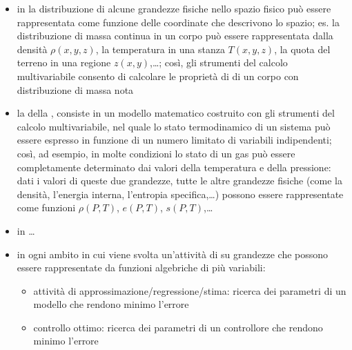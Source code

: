 \documentclass[letterpaper,10pt,italian]{jupyterBook}
\begin{document}
\begin{itemize}
\item {} 
\sphinxAtStartPar
in  la distribuzione di alcune grandezze fisiche nello spazio fisico può essere rappresentata come funzione delle coordinate che descrivono lo spazio; es. la distribuzione di massa continua in un corpo può essere rappresentata dalla densità \(\rho(x,y,z)\), la temperatura in una stanza \(T(x,y,z)\), la quota del terreno in una regione \(z(x,y)\),…; così, gli strumenti del calcolo multivariabile consento di calcolare le proprietà di  di un corpo con distribuzione di massa nota

\item {} 
\sphinxAtStartPar
la  della , consiste in un modello matematico costruito con gli strumenti del calcolo multivariabile, nel quale lo stato termodinamico di un sistema può essere espresso in funzione di un numero limitato di variabili indipendenti; così, ad esempio, in molte condizioni lo stato di un gas può essere completamente determinato dai valori della temperatura e della pressione: dati i valori di queste due grandezze, tutte le altre grandezze fisiche (come la densità, l’energia interna, l’entropia specifica,…) possono essere rappresentate come funzioni \(\rho(P,T)\), \(e(P,T)\), \(s(P,T)\),…

\item {} 
\sphinxAtStartPar
in   …

\item {} 
\sphinxAtStartPar
in ogni ambito in cui viene svolta un’attività di  su grandezze che possono essere rappresentate da funzioni algebriche di più variabili:
\begin{itemize}
\item {} 
\sphinxAtStartPar
attività di approssimazione/regressione/stima: ricerca dei parametri di un modello che rendono minimo l’errore

\item {} 
\sphinxAtStartPar
controllo ottimo: ricerca dei parametri di un controllore che rendono minimo l’errore


\end{itemize}
\end{itemize}
\end{document}
